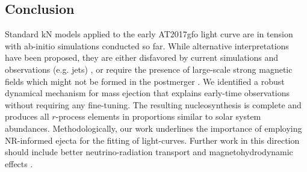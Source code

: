 \subsection{Conclusion}

Standard kN models applied to the early AT2017gfo light curve are in
tension with ab-initio simulations conducted so far.
While alternative interpretations have been proposed, they are either
disfavored by current simulations and observations (e.g. jets) \citep{Bromberg:2017crh,Duffell:2018iig},
or require the presence of large-scale strong magnetic 
fields which might not be formed in the postmerger
\citep{Metzger:2018uni,Fernandez:2018kax,Radice:2018ghv,Ciolfi:2019fie}. 
We identified a robust dynamical mechanism for mass ejection that
explains early-time observations without requiring any fine-tuning.
The resulting nucleosynthesis is complete and produces all
$r$-process elements in proportions similar to solar system abundances.
Methodologically, our work underlines the importance of employing
NR-informed ejecta for the fitting of light-curves.
Further work in this direction should 
include better neutrino-radiation transport and magnetohydrodynamic effects
\citep{Siegel:2017nub,Fujibayashi:2017puw,Radice:2018xqa,Radice:2018pdn,Miller:2019dpt}. 










